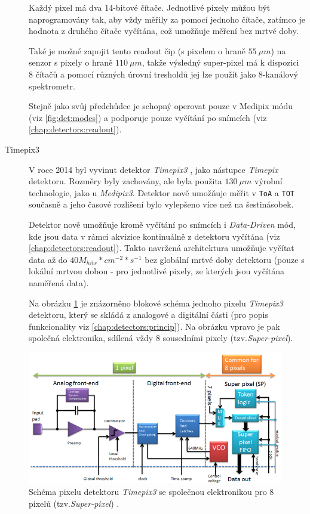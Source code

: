 \begin{description}
	Každý pixel má dva 14-bitové čítače. Jednotlivé pixely můžou být naprogramovány tak, aby vždy měřily za pomocí jednoho čítače, zatímco je hodnota z druhého čítače vyčítána, což umožňuje měření bez mrtvé doby.

	Také je možné zapojit tento readout čip (s pixelem o hraně $55~\mu m$) na senzor s pixely o hraně $110~\mu m$, takže výsledný super-pixel má k dispozici 8 čítačů a pomocí různých úrovní tresholdů jej lze použít jako 8-kanálový spektrometr.

	Stejně jako svůj předchůdce je schopný operovat pouze v Medipix módu (viz \ref{fig:det:modes}) a podporuje pouze vyčítání po snímcích (viz \ref{chap:detectors:readout}).

	\item[Timepix3]\label{chap:detectors:medipix_overview:timepix3} V roce 2014 byl vyvinut detektor \textit{Timepix3} \cite{timepix3}, jako nástupce \textit{Timepix} detektoru. Rozměry byly zachovány, ale byla použita $130~\mu m$ výrobní technologie, jako u \textit{Medipix3}. Detektor nově umožňuje měřit v \texttt{ToA} a \texttt{TOT} současně a jeho časové rozlišení bylo vylepšeno více než na šestinásobek.

	Detektor nově umožňuje kromě vyčítání po snímcích i \textit{Data-Driven} mód, kde jsou data v rámci akvizice kontinuálně z detektoru vyčítána (viz \ref{chap:detectors:readout}). Takto navržená architektura umožňuje vyčítat data až do $40M_{hits}*cm^{-2}*s^{-1}$ bez globální mrtvé doby detektoru (pouze s lokální mrtvou dobou - pro jednotlivé pixely, ze kterých jsou vyčítána naměřená data).

	Na obrázku \ref{fig:det:medipix_overview:timepix3_schema} je znázorněno blokové schéma jednoho pixelu \textit{Timepix3} detektoru, který se skládá z analogové a digitální části (pro popis funkcionality viz \ref{chap:detectors:princip}). Na obrázku vpravo je pak společná elektronika, sdílená vždy 8 sousedními pixely (tzv.\textit{Super-pixel}).

\end{description}

\begin{figure}
	\begin{center}
		\includegraphics[width=15cm]{figures/det_timepix3_schema.png}
		\caption{Schéma pixelu detektoru \textit{Timepix3} se společnou elektronikou pro 8 pixelů (tzv.\textit{Super-pixel}) \cite{timepix3}.}
		\label{fig:det:medipix_overview:timepix3_schema}
	\end{center}
\end{figure}

